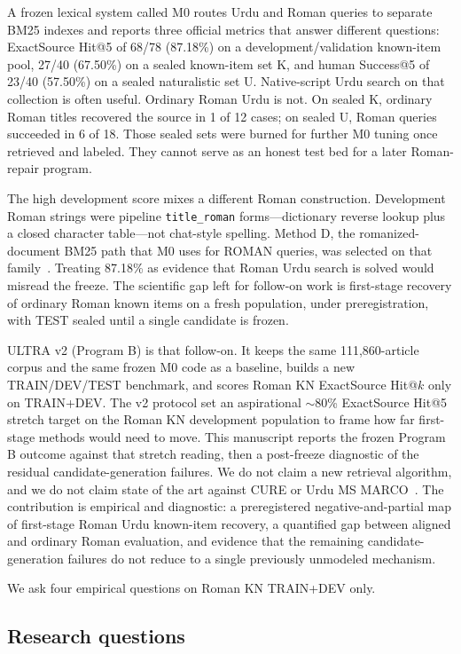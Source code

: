 \documentclass[10pt,letterpaper]{article}
\begin{document}
A frozen lexical system called M0 routes Urdu and Roman queries to separate BM25 indexes and reports three official metrics that answer different questions: ExactSource Hit@5 of 68/78 (87.18\%) on a development/validation known-item pool, 27/40 (67.50\%) on a sealed known-item set K, and human Success@5 of 23/40 (57.50\%) on a sealed naturalistic set U. Native-script Urdu search on that collection is often useful. Ordinary Roman Urdu is not. On sealed K, ordinary Roman titles recovered the source in 1 of 12 cases; on sealed U, Roman queries succeeded in 6 of 18. Those sealed sets were burned for further M0 tuning once retrieved and labeled. They cannot serve as an honest test bed for a later Roman-repair program.

The high development score mixes a different Roman construction. Development Roman strings were pipeline \texttt{title\_roman} forms---dictionary reverse lookup plus a closed character table---not chat-style spelling. Method D, the romanized-document BM25 path that M0 uses for ROMAN queries, was selected on that family~\cite{bib13}. Treating 87.18\% as evidence that Roman Urdu search is solved would misread the freeze. The scientific gap left for follow-on work is first-stage recovery of ordinary Roman known items on a fresh population, under preregistration, with TEST sealed until a single candidate is frozen.

ULTRA v2 (Program B) is that follow-on. It keeps the same 111,860-article corpus and the same frozen M0 code as a baseline, builds a new TRAIN/DEV/TEST benchmark, and scores Roman KN ExactSource Hit@$k$ only on TRAIN+DEV. The v2 protocol set an aspirational $\sim$80\% ExactSource Hit@5 stretch target on the Roman KN development population to frame how far first-stage methods would need to move. This manuscript reports the frozen Program B outcome against that stretch reading, then a post-freeze diagnostic of the residual candidate-generation failures. We do not claim a new retrieval algorithm, and we do not claim state of the art against CURE or Urdu MS MARCO~\cite{bib5,bib6}. The contribution is empirical and diagnostic: a preregistered negative-and-partial map of first-stage Roman Urdu known-item recovery, a quantified gap between aligned and ordinary Roman evaluation, and evidence that the remaining candidate-generation failures do not reduce to a single previously unmodeled mechanism.

We ask four empirical questions on Roman KN TRAIN+DEV only.

\subsection*{Research questions}
\end{document}
